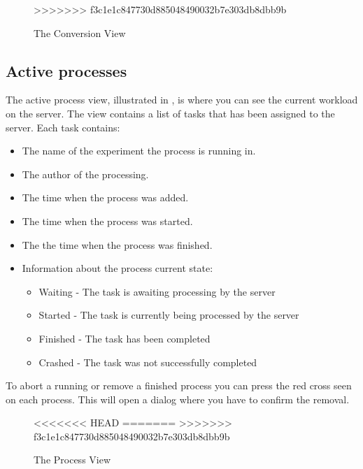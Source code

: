 \begin{figure}[h]
\caption{The Conversion View}
\label{fig:and_conversion_man}
>>>>>>> f3c1e1c847730d885048490032b7e303db8dbb9b
\end{figure}

\FloatBarrier


\subsection{Active processes}
The active process view, illustrated in , is where you can see the current workload on the server. The view contains a list of tasks that has been assigned to the server. Each task contains:
\begin{itemize}
\item The name of the experiment the process is running in.
\item The author of the processing.
\item The time when the process was added.
\item The time when the process was started.
\item The the time when the process was finished. 
\item Information about the process current state:
\begin{itemize}
\item Waiting  - The task is awaiting processing by the server
\item Started  - The task is currently being processed by the server
\item Finished - The task has been completed
\item Crashed - The task was not successfully completed
\end{itemize}
\end{itemize}

To abort a running or remove a finished process you can press the red cross seen on each process. This will open a dialog where you have to confirm the removal.


\begin{figure}[h]
<<<<<<< HEAD
=======
>>>>>>> f3c1e1c847730d885048490032b7e303db8dbb9b
\caption{ The Process View}
\label{fig:and_process_man}
\end{figure}

\FloatBarrier
